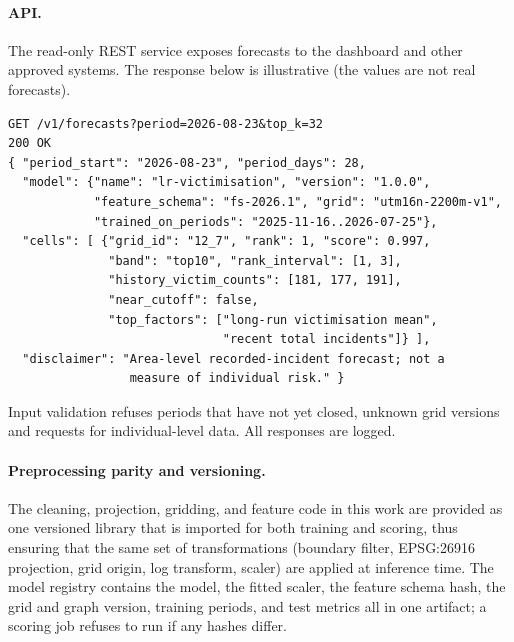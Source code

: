 \documentclass[11pt,a4paper]{report}
\begin{document}
\paragraph{API.} The read-only REST service exposes forecasts to the dashboard and other approved systems. The response below is illustrative (the values are not real forecasts).
\begin{small}
\begin{verbatim}
GET /v1/forecasts?period=2026-08-23&top_k=32
200 OK
{ "period_start": "2026-08-23", "period_days": 28,
  "model": {"name": "lr-victimisation", "version": "1.0.0",
            "feature_schema": "fs-2026.1", "grid": "utm16n-2200m-v1",
            "trained_on_periods": "2025-11-16..2026-07-25"},
  "cells": [ {"grid_id": "12_7", "rank": 1, "score": 0.997,
              "band": "top10", "rank_interval": [1, 3],
              "history_victim_counts": [181, 177, 191],
              "near_cutoff": false,
              "top_factors": ["long-run victimisation mean",
                              "recent total incidents"]} ],
  "disclaimer": "Area-level recorded-incident forecast; not a
                 measure of individual risk." }
\end{verbatim}
\end{small}
Input validation refuses periods that have not yet closed, unknown grid versions and requests for individual-level data. All responses are logged.

\paragraph{Preprocessing parity and versioning.} The cleaning, projection, gridding, and feature code in this work are provided as one versioned library that is imported for both training and scoring, thus ensuring that the same set of transformations (boundary filter, EPSG:26916 projection, grid origin, log transform, scaler) are applied at inference time. The model registry contains the model, the fitted scaler, the feature schema hash, the grid and graph version, training periods, and test metrics all in one artifact; a scoring job refuses to run if any hashes differ.
\end{document}
